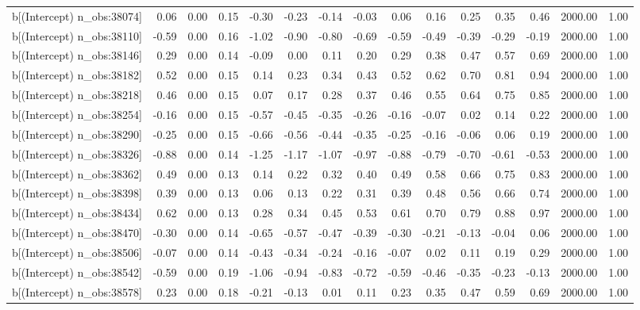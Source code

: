 \begin{table}[ht]
\begin{tabular}{rrrrrrrrrrrrrrr}
  b[(Intercept) n\_obs:38074] & 0.06 & 0.00 & 0.15 & -0.30 & -0.23 & -0.14 & -0.03 & 0.06 & 0.16 & 0.25 & 0.35 & 0.46 & 2000.00 & 1.00 \\ 
  b[(Intercept) n\_obs:38110] & -0.59 & 0.00 & 0.16 & -1.02 & -0.90 & -0.80 & -0.69 & -0.59 & -0.49 & -0.39 & -0.29 & -0.19 & 2000.00 & 1.00 \\ 
  b[(Intercept) n\_obs:38146] & 0.29 & 0.00 & 0.14 & -0.09 & 0.00 & 0.11 & 0.20 & 0.29 & 0.38 & 0.47 & 0.57 & 0.69 & 2000.00 & 1.00 \\ 
  b[(Intercept) n\_obs:38182] & 0.52 & 0.00 & 0.15 & 0.14 & 0.23 & 0.34 & 0.43 & 0.52 & 0.62 & 0.70 & 0.81 & 0.94 & 2000.00 & 1.00 \\ 
  b[(Intercept) n\_obs:38218] & 0.46 & 0.00 & 0.15 & 0.07 & 0.17 & 0.28 & 0.37 & 0.46 & 0.55 & 0.64 & 0.75 & 0.85 & 2000.00 & 1.00 \\ 
  b[(Intercept) n\_obs:38254] & -0.16 & 0.00 & 0.15 & -0.57 & -0.45 & -0.35 & -0.26 & -0.16 & -0.07 & 0.02 & 0.14 & 0.22 & 2000.00 & 1.00 \\ 
  b[(Intercept) n\_obs:38290] & -0.25 & 0.00 & 0.15 & -0.66 & -0.56 & -0.44 & -0.35 & -0.25 & -0.16 & -0.06 & 0.06 & 0.19 & 2000.00 & 1.00 \\ 
  b[(Intercept) n\_obs:38326] & -0.88 & 0.00 & 0.14 & -1.25 & -1.17 & -1.07 & -0.97 & -0.88 & -0.79 & -0.70 & -0.61 & -0.53 & 2000.00 & 1.00 \\ 
  b[(Intercept) n\_obs:38362] & 0.49 & 0.00 & 0.13 & 0.14 & 0.22 & 0.32 & 0.40 & 0.49 & 0.58 & 0.66 & 0.75 & 0.83 & 2000.00 & 1.00 \\ 
  b[(Intercept) n\_obs:38398] & 0.39 & 0.00 & 0.13 & 0.06 & 0.13 & 0.22 & 0.31 & 0.39 & 0.48 & 0.56 & 0.66 & 0.74 & 2000.00 & 1.00 \\ 
  b[(Intercept) n\_obs:38434] & 0.62 & 0.00 & 0.13 & 0.28 & 0.34 & 0.45 & 0.53 & 0.61 & 0.70 & 0.79 & 0.88 & 0.97 & 2000.00 & 1.00 \\ 
  b[(Intercept) n\_obs:38470] & -0.30 & 0.00 & 0.14 & -0.65 & -0.57 & -0.47 & -0.39 & -0.30 & -0.21 & -0.13 & -0.04 & 0.06 & 2000.00 & 1.00 \\ 
  b[(Intercept) n\_obs:38506] & -0.07 & 0.00 & 0.14 & -0.43 & -0.34 & -0.24 & -0.16 & -0.07 & 0.02 & 0.11 & 0.19 & 0.29 & 2000.00 & 1.00 \\ 
  b[(Intercept) n\_obs:38542] & -0.59 & 0.00 & 0.19 & -1.06 & -0.94 & -0.83 & -0.72 & -0.59 & -0.46 & -0.35 & -0.23 & -0.13 & 2000.00 & 1.00 \\ 
  b[(Intercept) n\_obs:38578] & 0.23 & 0.00 & 0.18 & -0.21 & -0.13 & 0.01 & 0.11 & 0.23 & 0.35 & 0.47 & 0.59 & 0.69 & 2000.00 & 1.00 \\ 

\end{tabular}
\end{table}
